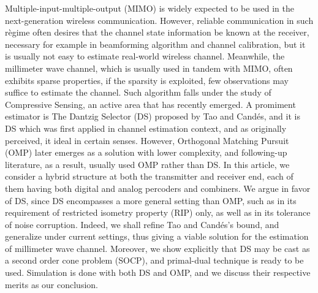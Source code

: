 
\starttitle [title={Abstract}]

Multiple-input-multiple-output (MIMO) is widely expected to be used in the next-generation wireless communication.
However, reliable communication in such r\`egime often desires that the channel state information be known at the receiver, necessary for example in beamforming algorithm and channel calibration, but it is usually not easy to estimate real-world wireless channel.
Meanwhile, the millimeter wave channel, which is usually used in tandem with MIMO, often exhibits sparse properties, if the sparsity is exploited, few observations may suffice to estimate the channel.
Such algorithm falls under the study of Compressive Sensing, an active area that has recently emerged.
A promiment estimator is The Dantzig Selector (DS) proposed by Tao and Cand\'es, and it is DS which was first applied in channel estimation context, and as originally perceived, it ideal in certain senses.
However, Orthogonal Matching Pursuit (OMP) later emerges as a solution with lower complexity, and following-up literature, as a result, usually used OMP rather than DS.
In this article, we consider a hybrid structure at both the transmitter and receiver end, each of them having both digital and analog percoders and combiners.
We argue in favor of DS, since DS encompasses a more general setting than OMP, such as in its requirement of restricted isometry property (RIP) only, as well as in its tolerance of noise corruption.
Indeed, we shall refine Tao and Cand\'es's bound, and generalize under current settings, thus giving a viable solution for the estimation of millimeter wave channel.
Moreover, we show explicitly that DS may be cast as a second order cone problem (SOCP), and primal-dual technique is ready to be used.
Simulation is done with both DS and OMP, and we discuss their respective merits as our conclusion.


\stoptitle
